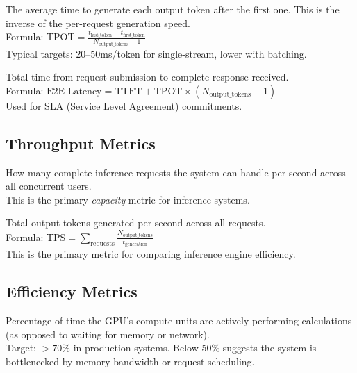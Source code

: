 \documentclass[12pt, twoside, openright]{book}
\begin{document}
\begin{defbox}
The average time to generate each output token after the first one.
This is the inverse of the per-request generation speed.\\[4pt]
Formula: $\text{TPOT} = \frac{t_{\text{last\_token}} - t_{\text{first\_token}}}{N_{\text{output\_tokens}} - 1}$\\[4pt]
Typical targets: 20--50ms/token for single-stream, lower with batching.
\end{defbox}

\begin{defbox}
Total time from request submission to complete response received.\\[4pt]
Formula: $\text{E2E Latency} = \text{TTFT} + \text{TPOT} \times (N_{\text{output\_tokens}} - 1)$\\[4pt]
Used for SLA (Service Level Agreement) commitments.
\end{defbox}

\subsection{Throughput Metrics}

\begin{defbox}
How many complete inference requests the system can handle per second
across all concurrent users.\\[4pt]
This is the primary \textit{capacity} metric for inference systems.
\end{defbox}

\begin{defbox}
Total output tokens generated per second across all requests.\\[4pt]
Formula: $\text{TPS} = \sum_{\text{requests}} \frac{N_{\text{output\_tokens}}}{t_{\text{generation}}}$\\[4pt]
This is the primary metric for comparing inference engine efficiency.
\end{defbox}

\subsection{Efficiency Metrics}

\begin{defbox}
Percentage of time the GPU's compute units are actively performing
calculations (as opposed to waiting for memory or network).\\[4pt]
Target: $>70\%$ in production systems. Below 50\% suggests the system
is bottlenecked by memory bandwidth or request scheduling.
\end{defbox}
\end{document}
